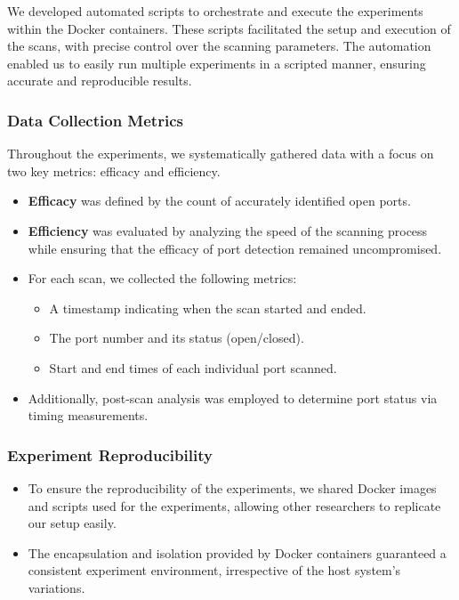 We developed automated scripts to orchestrate and execute the experiments within the Docker containers. These scripts facilitated the setup and execution of the scans, with precise control over the scanning parameters.
The automation enabled us to easily run multiple experiments in a scripted manner, ensuring accurate and reproducible results.

\subsubsection{Data Collection Metrics}

Throughout the experiments, we systematically gathered data with a focus on two key metrics: efficacy and efficiency.

\begin{itemize}
    \item \textbf{Efficacy} was defined by the count of accurately identified open ports.
    \item \textbf{Efficiency} was evaluated by analyzing the speed of the scanning process while ensuring that the efficacy of port detection remained uncompromised.
    \item For each scan, we collected the following metrics:
    \begin{itemize}
        \item A timestamp indicating when the scan started and ended.
        \item The port number and its status (open/closed).
        \item Start and end times of each individual port scanned.
    \end{itemize}
    \item Additionally, post-scan analysis was employed to determine port status via timing measurements.
\end{itemize}

\subsubsection{Experiment Reproducibility}
\begin{itemize}
    \item To ensure the reproducibility of the experiments, we shared Docker images and scripts used for the experiments, allowing other researchers to replicate our setup easily.
    \item The encapsulation and isolation provided by Docker containers guaranteed a consistent experiment environment, irrespective of the host system's variations.
\end{itemize}

